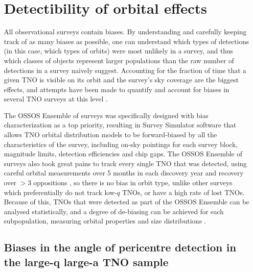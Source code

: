 \documentclass[preprint]{aastex62}
\begin{document}
\section{Detectibility of orbital effects}

All observational surveys contain biases.
By understanding and carefully keeping track of as many biases as possible, one can understand which types of detections (in this case, which types of orbits) were most unlikely in a survey, and thus which classes of objects represent larger populations than the raw number of detections in a survey naively suggest.
Accounting for the fraction of time that a given TNO is visible on its orbit and the survey's sky coverage are the biggest effects, and attempts have been made to quantify and account for biases in several TNO surveys at this level
\citep[e.g.][]{schwambetal10,adams14}.

The OSSOS Ensemble of surveys \citep{petit11,alexandersen16,petit17,bannister18} was specifically designed with bias characterization as a top priority, resulting in Survey Simulator software \citep{petit2018} that allows TNO orbital distribution models to be forward-biased by all the characteristics of the survey, including on-sky pointings for each survey block, magnitude limits, detection efficiencies and chip gaps.
The OSSOS Ensemble of surveys also took great pains to track every single TNO that was detected, using careful orbital measurements over 5 months in each discovery year and recovery over $>3$ oppositions \citep{bannister18}, so there is no bias in orbit type, unlike other surveys which preferentially do not track low-$q$ TNOs, or have a high rate of lost TNOs.
Because of this, TNOs that were detected as part of the OSSOS Ensemble can be analysed statistically, and a degree of de-biasing can be achieved for each subpopulation, measuring orbital properties and size distributions \citep{lawler2018}.

\subsection{Biases in the angle of pericentre detection in the large-q large-a TNO sample}
\end{document}
